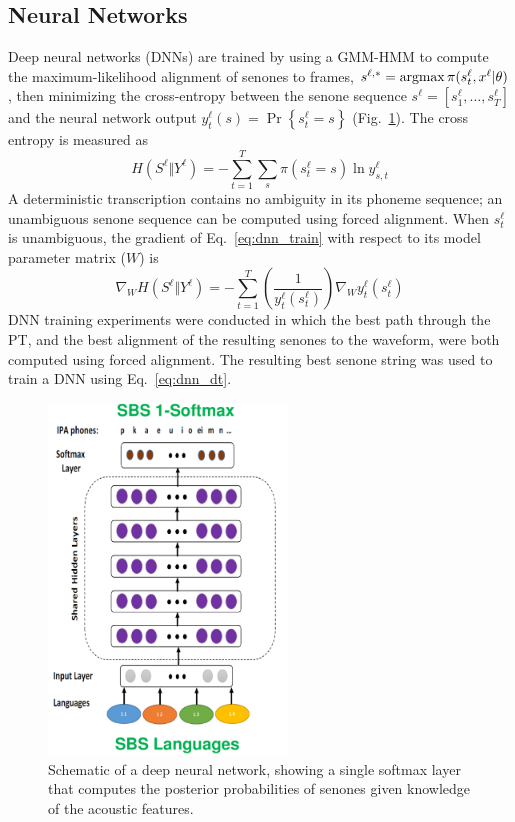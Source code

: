 \subsection{Neural Networks}

Deep neural networks
(DNNs) are trained by using a GMM-HMM to compute the maximum-likelihood
alignment of senones to frames, $s^{\ell,*}=\operatorname*{argmax}
\pi(s_t^\ell,x^\ell|\theta)$, then minimizing the cross-entropy between
the senone sequence $s^\ell=[s_1^\ell,\ldots,s_T^\ell]$ and the neural
network output $y_{t}^\ell(s)=\Pr\left\{s_t^\ell=s\right\}$
(Fig.~\ref{fig:das1}).  The cross entropy is measured as
\begin{equation}
  H(S^\ell\Vert Y^\ell)=-\sum_{t=1}^T \sum_{s} \pi(s_t^\ell=s) \ln y_{s,t}^\ell
  \label{eq:dnn_train}
\end{equation}
A deterministic transcription contains no ambiguity in its phoneme
sequence; an unambiguous senone sequence can be computed using forced
alignment.  When $s_t^\ell$ is unambiguous, the gradient of
Eq.~\ref{eq:dnn_train} with respect to its model parameter matrix
($W$) is
\begin{equation}
  \nabla_W H(S^\ell\Vert Y^\ell)=-\sum_{t=1}^T
  \left(\frac{1}{y_t^\ell(s_t^\ell)}\right)\nabla_W y_t^\ell(s_t^\ell)
  \label{eq:dnn_dt}
\end{equation}
DNN training experiments were conducted in which the best path through
the PT, and the best alignment of the resulting senones to the
waveform, were both computed using forced alignment.  The resulting
best senone string was used to train a DNN using Eq.~\ref{eq:dnn_dt}.

\begin{figure}
  \centerline{\includegraphics[width=2.5in]{../figs/das1.png}}
  \caption{Schematic of a deep neural network, showing a single
    softmax layer that computes the posterior probabilities of senones
    given knowledge of the acoustic features.}
  \label{fig:das1}
\end{figure}

